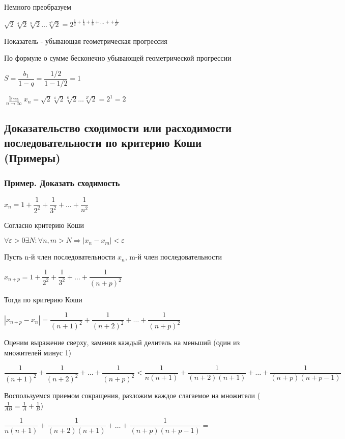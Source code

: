 Немного преобразуем

$ \sqrt{2} \sqrt[4]{2} \sqrt[8]{2} \ldots \sqrt[2^{n}]{2} =
2^{\frac{1}{2} + \frac{1}{4} + \frac{1}{8} + \ldots + + \frac{1}{2^{n}}}
$

Показатель - убывающая геометрическая прогрессия

По формуле о сумме бесконечно убывающей геометрической прогрессии

$S = \dfrac{b_{1}}{1 - q} = \dfrac{1/2}{1 - 1/2} = 1$

$  \lim\limits_{n \to \infty} x_{n} = 
\sqrt{2} \sqrt[4]{2} \sqrt[8]{2} \ldots \sqrt[2^{n}]{2} = 
2^{1} = 2 $


\subsection{Доказательство сходимости или расходимости последовательности по критерию Коши (Примеры)}

\subsubsection{Пример. Доказать сходимость}

$ x_{n} = 1 +
\dfrac{1}{2^{2}} + 
\dfrac{1}{3^{2}} + 
\ldots +
\dfrac{1}{n^{2}}
$

Согласно критерию Коши

$ \forall \varepsilon > 0 \exists N: \forall n,m > N \Rightarrow |x_{n} - x_{m}| < \varepsilon $

Пусть n-й член последовательности $ x_{n} $, 
m-й член последовательности 

$ x_{n+p} = 1 + \dfrac{1}{2^{2}} + 
\dfrac{1}{3^{2}} + 
\ldots +
\dfrac{1}{(n+p)^{2}} $

Тогда по критерию Коши

$ |x_{n+p} - x_{n}| = 
\dfrac{1}{(n+1)^{2}} +
\dfrac{1}{(n+2)^{2}} +
\ldots +
\dfrac{1}{(n+p)^{2}} $

Оценим выражение сверху, заменив каждый делитель на меньший (один из множителей минус 1)

$ 
\dfrac{1}{(n+1)^{2}} +
\dfrac{1}{(n+2)^{2}} +
\ldots +
\dfrac{1}{(n+p)^{2}}
<
\dfrac{1}{n(n+1)} +
\dfrac{1}{(n+2)(n+1)} +
\ldots +
\dfrac{1}{(n+p)(n+p-1)}
$

Воспользуемся приемом сокращения, разложим каждое слагаемое на множители 
($ \frac{1}{AB} = \frac{1}{A} + \frac{1}{B} $)

$
\dfrac{1}{n(n+1)} +
\dfrac{1}{(n+2)(n+1)} +
\ldots +
\dfrac{1}{(n+p)(n+p-1)} =
$

